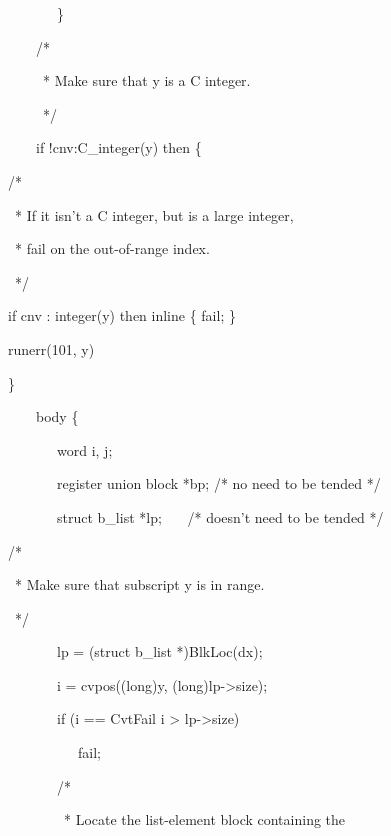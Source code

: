 {\ttfamily\mdseries
\ \ \ \ \ \ \ \ \ \ \ \ \}}

{\ttfamily\mdseries
\ \ \ \ \ \ \ \ \ /*}

{\ttfamily\mdseries
\ \ \ \ \ \ \ \ \ \ * Make sure that y is a C integer.}

{\ttfamily\mdseries
\ \ \ \ \ \ \ \ \ \ */}

{\ttfamily\mdseries
\ \ \ \ \ \ \ \ \ if !cnv:C\_integer(y) then \{}

{\ttfamily\mdseries
\ \  \ \ \ /*}

{\ttfamily\mdseries
\ \  \ \ \ \ * If it isn't a C integer, but is a large integer,}

{\ttfamily\mdseries
\ \  \ \ \ \ * fail on the out-of-range index.}

{\ttfamily\mdseries
\ \  \ \ \ \ */}

{\ttfamily\mdseries
\ \  \ \ \ if cnv : integer(y) then inline \{ fail; \}}

{\ttfamily\mdseries
\ \  \ \ \ runerr(101, y)}

{\ttfamily\mdseries
\ \  \ \ \ \}}

{\ttfamily\mdseries
\ \ \ \ \ \ \ \ \ body \{}

{\ttfamily\mdseries
\ \ \ \ \ \ \ \ \ \ \ \ word i, j;}

{\ttfamily\mdseries
\ \ \ \ \ \ \ \ \ \ \ \ register union block *bp; /* no need to be tended */}

{\ttfamily\mdseries
\ \ \ \ \ \ \ \ \ \ \ \ struct b\_list *lp; \ \ \ /* doesn't need to be tended */}


\bigskip

{\ttfamily\mdseries
\ \  \ \ \ /*}

{\ttfamily\mdseries
\ \  \ \ \ \ * Make sure that subscript y is in range.}

{\ttfamily\mdseries
\ \  \ \ \ \ */}

{\ttfamily\mdseries
\ \ \ \ \ \ \ \ \ \ \ \ lp = (struct b\_list *)BlkLoc(dx);}

{\ttfamily\mdseries
\ \ \ \ \ \ \ \ \ \ \ \ i = cvpos((long)y, (long)lp-{\textgreater}size);}

{\ttfamily\mdseries
\ \ \ \ \ \ \ \ \ \ \ \ if (i == CvtFail {\textbar}{\textbar} i {\textgreater} lp-{\textgreater}size)}

{\ttfamily\mdseries
\ \ \ \ \ \ \ \ \ \ \ \ \ \ \ fail;}

{\ttfamily\mdseries
\ \ \ \ \ \ \ \ \ \ \ \ /*}

{\ttfamily\mdseries
\ \ \ \ \ \ \ \ \ \ \ \ \ * Locate the list-element block containing the}

